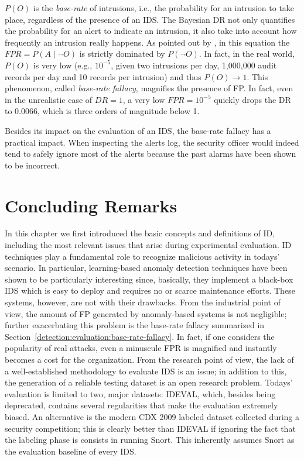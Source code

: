 \noindent $P(O)$ is the \emph{base-rate} of intrusions, i.e., the
probability for an intrusion to take place, regardless of the presence
of an \ac{IDS}. The Bayesian \ac{DR} not only quantifies the
probability for an alert to indicate an intrusion, it also take into
account how frequently an intrusion really happens. As pointed out by
\citep{axelsson:tissec2000:fallacy}, in this equation the $FPR = P(A
\mid \neg O)$ is strictly dominated by $P(\neg O)$. In fact, in the
real world, $P(O)$ is very low (e.g., $10^{-5}$, given two intrusions
per day, 1,000,000 audit records per day and 10 records per intrusion)
and thus $P(O) \to 1$. This phenomenon, called \emph{base-rate
fallacy}, magnifies the presence of \ac{FP}. In fact, even in the
unrealistic case of $DR = 1$, a very low $FPR = 10^{-5}$ quickly drops
the \ac{DR} to $0.0066$, which is three orders of magnitude below 1.

Besides its impact on the evaluation of an \ac{IDS}, the base-rate
fallacy has a practical impact. When inspecting the alerts log, the
security officer would indeed tend to safely ignore most of the alerts
because the past alarms have been shown to be incorrect.

\section{Concluding Remarks}
\label{detection:conclusions} In this chapter we first introduced the
basic concepts and definitions of \ac{ID}, including the most relevant
issues that arise during experimental evaluation. \ac{ID} techniques
play a fundamental role to recognize malicious activity in todays'
scenario. In particular, learning-based anomaly detection techniques
have been shown to be particularly interesting since, basically, they
implement a black-box \ac{IDS} which is easy to deploy and requires no
or scarce maintenance efforts. These systems, however, are not with
their drawbacks. From the industrial point of view, the amount of
\ac{FP} generated by anomaly-based systems is not negligible; further
exacerbating this problem is the base-rate fallacy summarized in
Section~\ref{detection:evaluation:base-rate-fallacy}. In fact, if one
considers the popularity of real attacks, even a minuscule \ac{FPR} is
magnified and instantly becomes a cost for the organization. From the
research point of view, the lack of a well-established methodology to
evaluate \ac{IDS} is an issue; in addition to this, the generation of
a reliable testing dataset is an open research problem. Todays'
evaluation is limited to two, major datasets: \ac{IDEVAL}, which,
besides being deprecated, contains several regularities that make the
evaluation extremely biased. An alternative is the modern
\ac{CDX} 2009 labeled dataset collected during a security
competition; this is clearly better than \ac{IDEVAL} if ignoring the
fact that the labeling phase is consists in running
\textsf{Snort}. This inherently assumes \textsf{Snort} as the
evaluation baseline of every \ac{IDS}.

